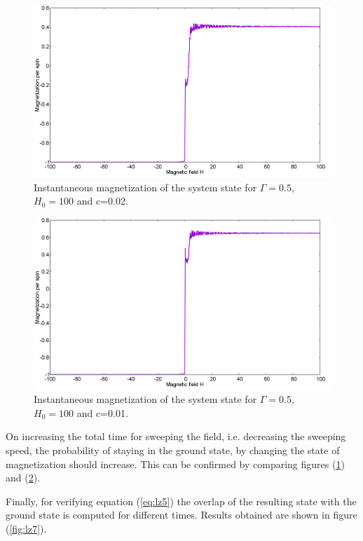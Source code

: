 \documentclass[../main.tex]{subfiles}
\begin{document}
\begin{figure}[H]
  \centering
    \includegraphics[scale=0.3]{Mag_13_H100.png}
    \caption{Instantaneous magnetization of the system state for $\Gamma=0.5$, $H_0=100$ and c=0.02.}
  \label{fig:lz5}
 \end{figure}
 \begin{figure}[H]
    \includegraphics[scale=0.3]{Mag_9_H100.png}
    \caption{Instantaneous magnetization of the system state for $\Gamma=0.5$, $H_0=100$ and c=0.01.}
  \label{fig:lz6}
\end{figure}
On increasing the total time for sweeping the field, i.e. decreasing the sweeping speed, the probability of staying in the ground state, by changing the state of magnetization should increase. This can be confirmed by comparing figures (\ref{fig:lz5}) and (\ref{fig:lz6}).

Finally, for verifying equation ({\ref{eq:lz5}}) the overlap of the resulting state with the ground state is computed for different times. Results obtained are shown in figure (\ref{fig:lz7}). 
\end{document}
